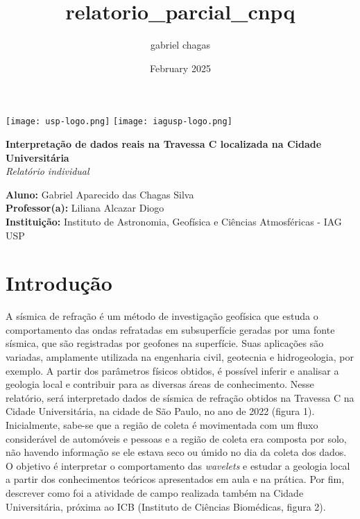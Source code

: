 \documentclass[a4paper,12pt]{article}
\title{relatorio_parcial_cnpq}
\author{gabriel chagas}
\date{February 2025}
\begin{document}
\begin{center}
    \texttt{[image: usp-logo.png]} \hfill 
    \texttt{[image: iagusp-logo.png]} 
        
    \vspace{1cm}
    {\Large \textbf{Interpretação de dados reais na Travessa C localizada na Cidade Universitária}}\\[0.5cm]
    {\large \textit{Relatório individual}}\\[1cm]
\end{center}


\textbf{Aluno:} Gabriel Aparecido das Chagas Silva\\

\textbf{Professor(a):} Liliana Alcazar Diogo \\

\textbf{Instituição:} Instituto de Astronomia, Geofísica e Ciências Atmosféricas - IAG USP\\
\headrule{}

\vspace{1cm}



\section{Introdução}

A sísmica de refração é um método de investigação geofísica que estuda o comportamento das ondas refratadas em subsuperfície geradas por uma fonte sísmica, que são registradas por geofones na superfície. Suas aplicações são variadas, amplamente utilizada na engenharia civil, geotecnia e hidrogeologia, por exemplo. A partir dos parâmetros físicos obtidos, é possível inferir e analisar a geologia local e contribuir para as diversas áreas de conhecimento. Nesse relatório, será interpretado dados de sísmica de refração obtidos na Travessa C na Cidade Universitária, na cidade de São Paulo, no ano de 2022 (figura 1). Inicialmente, sabe-se que a região de coleta é movimentada com um fluxo considerável de automóveis e pessoas e a região de coleta era composta por solo, não havendo informação se ele estava seco ou úmido no dia da coleta dos dados. O objetivo é interpretar o comportamento das \textit{wavelets} e estudar a geologia local a partir dos conhecimentos teóricos apresentados em aula e na prática. Por fim, descrever como foi a atividade de campo realizada também na Cidade Universitária, próxima ao ICB (Instituto de Ciências Biomédicas, figura 2). 
\end{document}
